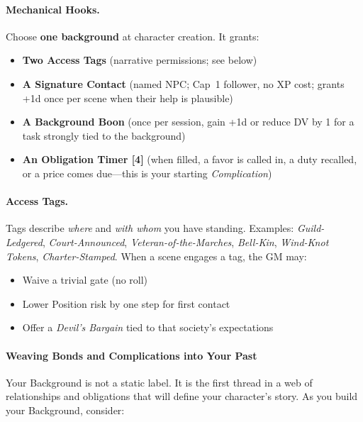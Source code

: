 \paragraph{Mechanical Hooks.}
Choose \textbf{one background} at character creation. It grants:
\begin{itemize}
\item \textbf{Two Access Tags} (narrative permissions; see below)
\item \textbf{A Signature Contact} (named NPC; Cap~1 follower, no XP cost; grants +1d once per scene when their help is plausible)
\item \textbf{A Background Boon} (once per session, gain +1d or reduce DV by 1 for a task strongly tied to the background)
\item \textbf{An Obligation Timer [4]} (when filled, a favor is called in, a duty recalled, or a price comes due---this is your starting \emph{Complication})
\end{itemize}

\paragraph{Access Tags.}
Tags describe \emph{where} and \emph{with whom} you have standing. Examples: \textit{Guild-Ledgered}, \textit{Court-Announced}, \textit{Veteran-of-the-Marches}, \textit{Bell-Kin}, \textit{Wind-Knot Tokens}, \textit{Charter-Stamped}. When a scene engages a tag, the GM may:
\begin{itemize}
\item Waive a trivial gate (no roll)
\item Lower Position risk by one step for first contact
\item Offer a \emph{Devil's Bargain} tied to that society's expectations
\end{itemize}

\paragraph{Weaving Bonds and Complications into Your Past}

Your Background is not a static label. It is the first thread in a web of relationships and obligations that will define your character's story. As you build your Background, consider:

